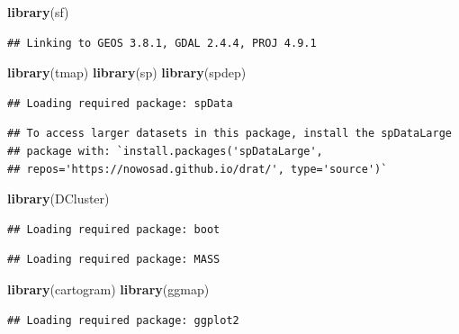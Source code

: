 \documentclass[]{book}
\newenvironment{Shaded}{\begin{snugshade}}{\end{snugshade}}
\newcommand{\KeywordTok}[1]{\textcolor[rgb]{0.13,0.29,0.53}{\textbf{#1}}}
\newcommand{\NormalTok}[1]{#1}
\begin{document}
\begin{Shaded}
\begin{Highlighting}[]
\KeywordTok{library}\NormalTok{(sf)}
\end{Highlighting}
\end{Shaded}

\begin{verbatim}
## Linking to GEOS 3.8.1, GDAL 2.4.4, PROJ 4.9.1
\end{verbatim}

\begin{Shaded}
\begin{Highlighting}[]
\KeywordTok{library}\NormalTok{(tmap)}
\KeywordTok{library}\NormalTok{(sp)}
\KeywordTok{library}\NormalTok{(spdep)}
\end{Highlighting}
\end{Shaded}

\begin{verbatim}
## Loading required package: spData
\end{verbatim}

\begin{verbatim}
## To access larger datasets in this package, install the spDataLarge
## package with: `install.packages('spDataLarge',
## repos='https://nowosad.github.io/drat/', type='source')`
\end{verbatim}

\begin{Shaded}
\begin{Highlighting}[]
\KeywordTok{library}\NormalTok{(DCluster)}
\end{Highlighting}
\end{Shaded}

\begin{verbatim}
## Loading required package: boot
\end{verbatim}

\begin{verbatim}
## Loading required package: MASS
\end{verbatim}

\begin{Shaded}
\begin{Highlighting}[]
\KeywordTok{library}\NormalTok{(cartogram)}
\KeywordTok{library}\NormalTok{(ggmap)}
\end{Highlighting}
\end{Shaded}

\begin{verbatim}
## Loading required package: ggplot2
\end{verbatim}
\end{document}
